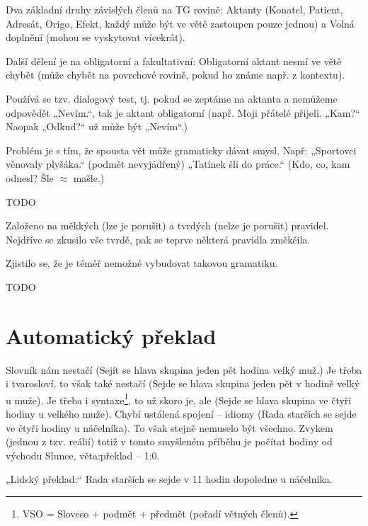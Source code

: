 \documentclass[12pt]{article}					%
\begin{document}
	\begin{definice}[Valence]
		Dva základní druhy závislých členů na TG rovině: Aktanty (Konatel, Patient, Adresát, Origo, Efekt, každý může být ve větě zastoupen pouze jednou) a Volná doplnění (mohou se vyskytovat vícekrát).
		
		Další dělení je na obligatorní a fakultativní: Obligatorní aktant nesmí ve větě chybět (může chybět na povrchové rovině, pokud ho známe např. z kontextu).

		Používá se tzv. dialogový test, tj. pokud se zeptáme na aktanta a nemůžeme odpovědět „Nevím.“, tak je aktant obligatorní (např. Moji přátelé přijeli. „Kam?“ Naopak „Odkud?“ už může být „Nevím“.)
	\end{definice}

	\begin{definice}
		Problém je s tím, že spousta vět může gramaticky dávat smysl. Např: „Sportovci věnovaly plyšáka.“ (podmět nevyjádřený) „Tatínek šli do práce.“ (Kdo, co, kam odnesl? Šle $\approx$ mašle.)
	\end{definice}

	\begin{definice}[RFODG]
		TODO

		Založeno na měkkých (lze je porušit) a tvrdých (nelze je porušit) pravidel. Nejdříve se zkusilo vše tvrdě, pak se teprve některá pravidla změkčila.

		Zjistilo se, že je téměř nemožné vybudovat takovou gramatiku.
	\end{definice}

	\begin{definice}[LanGR]
		TODO
	\end{definice}


\section{Automatický překlad}
\begin{poznamka}
	Slovník nám nestačí (Sejít se hlava skupina jeden pět hodina velký muž.) Je třeba i tvarosloví, to však také nestačí (Sejde se hlava skupina jeden pět v hodině velký u muže). Je třeba i syntaxe\footnote{VSO = Sloveso + podmět + předmět (pořadí větných členů).}, to už skoro je, ale (Sejde se hlava skupina ve čtyři hodiny u velkého muže). Chybí ustálená spojení – idiomy (Rada starších se sejde ve čtyři hodiny u náčelníka). To však stejně nemuselo být všechno. Zvykem (jednou z tzv. reálií) totiž v tomto smyšleném příběhu je počítat hodiny od východu Slunce, věta:překlad – 1:0.

	„Lidský překlad:“ Rada starších se sejde v 11 hodin dopoledne u náčelníka.
\end{poznamka}
\end{document}
